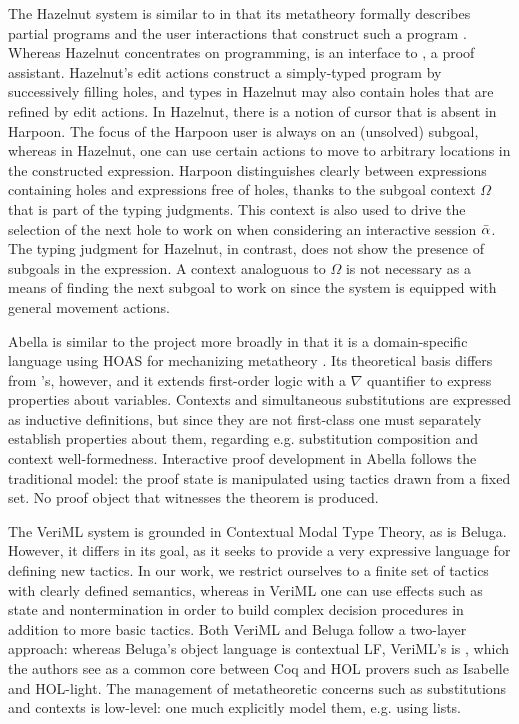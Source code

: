 The Hazelnut system is similar to \Harpoon{} in that its metatheory formally
describes partial programs and the user interactions that construct such a
program \cite{hazelnut}.
Whereas Hazelnut concentrates on programming, \Harpoon{} is an interface to
\Beluga, a proof assistant. Hazelnut's edit actions construct a simply-typed
program by successively filling holes, and types in Hazelnut may also contain
holes that are refined by edit actions.
In Hazelnut, there is a notion of cursor that is absent in Harpoon.
The focus of the Harpoon user is always on an (unsolved) subgoal, whereas in
Hazelnut, one can use certain actions to move to arbitrary locations in the
constructed expression.
Harpoon distinguishes clearly between expressions containing holes and
expressions free of holes, thanks to the subgoal context $\Omega$ that is part
of the typing judgments.
This context is also used to drive the selection of the next hole to work on
when considering an interactive session $\bar{\alpha}$.
The typing judgment for Hazelnut, in contrast, does not show the presence of
subgoals in the expression. A context analoguous to $\Omega$ is not necessary
as a means of finding the next subgoal to work on since the system is equipped
with general movement actions.

Abella is similar to the \Beluga{} project more broadly in that it is a
domain-specific language using HOAS for mechanizing metatheory
\cite{Gacek:IJCAR08, Gacek:JAR12}.
Its theoretical basis differs from \Beluga's, however, and it extends
first-order logic with a $\nabla$ quantifier to express properties about
variables. Contexts and simultaneous substitutions are expressed as inductive
definitions, but since they are not first-class one must separately establish
properties about them, regarding e.g. substitution composition and context
well-formedness. Interactive proof development in Abella follows the traditional
model: the proof state is manipulated using tactics drawn from a fixed set. No
proof object that witnesses the theorem is produced.

The VeriML system is grounded in Contextual Modal Type Theory, as is Beluga.
However, it differs in its goal, as it seeks to provide a very expressive
language for defining new tactics.
In our work, we restrict ourselves to a finite set of tactics with clearly
defined semantics, whereas in VeriML one can use effects such as state and
nontermination in order to build complex decision procedures in addition to more
basic tactics.
Both VeriML and Beluga follow a two-layer approach: whereas Beluga's object
language is contextual LF, VeriML's is \lhol, which the authors see as a common
core between Coq and HOL provers such as Isabelle and HOL-light.
The management of metatheoretic concerns such as substitutions and contexts is
low-level: one much explicitly model them, e.g. using lists.

